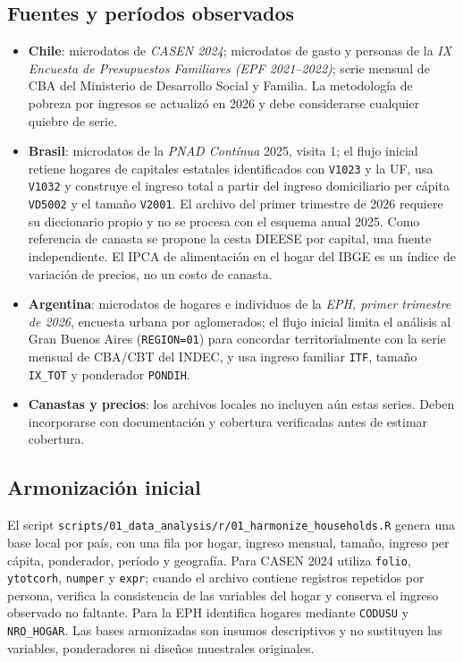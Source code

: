 \subsection{Fuentes y períodos observados}
\begin{itemize}
    \item \textbf{Chile}: microdatos de \textit{CASEN 2024}; microdatos de gasto y personas de la \textit{IX Encuesta de Presupuestos Familiares (EPF 2021--2022)}; serie mensual de CBA del Ministerio de Desarrollo Social y Familia. La metodología de pobreza por ingresos se actualizó en 2026 y debe considerarse cualquier quiebre de serie.
    \item \textbf{Brasil}: microdatos de la \textit{PNAD Contínua} 2025, visita 1; el flujo inicial retiene hogares de capitales estatales identificados con \texttt{V1023} y la UF, usa \texttt{V1032} y construye el ingreso total a partir del ingreso domiciliario per cápita \texttt{VD5002} y el tamaño \texttt{V2001}. El archivo del primer trimestre de 2026 requiere su diccionario propio y no se procesa con el esquema anual 2025. Como referencia de canasta se propone la cesta DIEESE por capital, una fuente independiente. El IPCA de alimentación en el hogar del IBGE es un índice de variación de precios, no un costo de canasta.
    \item \textbf{Argentina}: microdatos de hogares e individuos de la \textit{EPH, primer trimestre de 2026}, encuesta urbana por aglomerados; el flujo inicial limita el análisis al Gran Buenos Aires (\texttt{REGION=01}) para concordar territorialmente con la serie mensual de CBA/CBT del INDEC, y usa ingreso familiar \texttt{ITF}, tamaño \texttt{IX\_TOT} y ponderador \texttt{PONDIH}.
    \item \textbf{Canastas y precios}: los archivos locales no incluyen aún estas series. Deben incorporarse con documentación y cobertura verificadas antes de estimar cobertura.
\end{itemize}

\subsection{Armonización inicial}
El script \texttt{scripts/01\_data\_analysis/r/01\_harmonize\_households.R} genera una base local por país, con una fila por hogar, ingreso mensual, tamaño, ingreso per cápita, ponderador, período y geografía. Para CASEN 2024 utiliza \texttt{folio}, \texttt{ytotcorh}, \texttt{numper} y \texttt{expr}; cuando el archivo contiene registros repetidos por persona, verifica la consistencia de las variables del hogar y conserva el ingreso observado no faltante. Para la EPH identifica hogares mediante \texttt{CODUSU} y \texttt{NRO\_HOGAR}. Las bases armonizadas son insumos descriptivos y no sustituyen las variables, ponderadores ni diseños muestrales originales.

